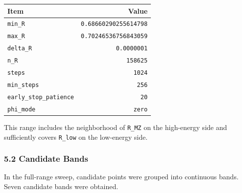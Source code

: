 \documentclass[
]{article}
\newcounter{none} %
\begin{document}
{\def\LTcaptype{none} %
\begin{longtable}[]{@{}lr@{}}
\toprule\noalign{}
Item & Value \\
\midrule\noalign{}
\endhead
\bottomrule\noalign{}
\endlastfoot
\texttt{min\_R} & \texttt{0.68660290255614798} \\
\texttt{max\_R} & \texttt{0.70246536756843059} \\
\texttt{delta\_R} & \texttt{0.0000001} \\
\texttt{n\_R} & \texttt{158625} \\
\texttt{steps} & \texttt{1024} \\
\texttt{min\_steps} & \texttt{256} \\
\texttt{early\_stop\_patience} & \texttt{20} \\
\texttt{phi\_mode} & \texttt{zero} \\
\end{longtable}
}

This range includes the neighborhood of \texttt{R\_MZ} on the
high-energy side and sufficiently covers \texttt{R\_low} on the
low-energy side.

\subsubsection{5.2 Candidate Bands}\label{candidate-bands}

In the full-range sweep, candidate points were grouped into continuous
bands. Seven candidate bands were obtained.
\end{document}
